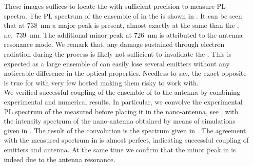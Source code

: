 			These images suffices to locate the \nd with sufficient precision to measure PL spectra.
			The PL spectrum of the ensemble of \sivs in the \nd is shown in . It can be seen that at \SI{738}{\nm} a major peak is present, almost exactly at the same \wl than the \siv \zpl, \i.e.\ \SI{739}{\nm}. The additional minor peak at \SI{726}{\nm} is attributed to the antenna resonance mode. We remark that, any damage sustained through electron radiation during the \pp process is likely not sufficient to invalidate the \nd. This is expected as a large ensemble of \sivs can easily lose several emitters without any noticeable difference in the optical properties. Needless to say, the exact opposite is true for \nds with very few hosted \sivs making them risky to work with.
			\\
			We verified successful coupling of the ensemble of \sivs to the antenna by combining experimental and numerical results. In particular, we convolve the experimental PL spectrum of the \nd measured before placing it in the nano-antenna, see ,  with the intensity spectrum of the nano-antenna obtained by means of simulations given in .
			The result of the convolution is the spectrum given in . The agreement with the measured spectrum in  is almost perfect, indicating successful coupling of emitters and antenna. At the same time we confirm that the minor peak in  is indeed due to the antenna resonance.

